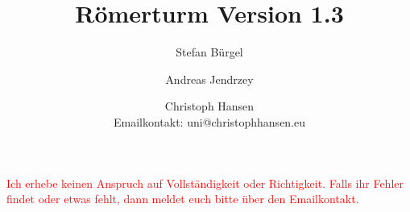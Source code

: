 \documentclass[a5paper,9pt,fleqn,twoside]{scrartcl}
\title{Römerturm Version 1.3}
\author{Stefan Bürgel \and Andreas Jendrzey \and Christoph Hansen \\ 
Emailkontakt: uni@christophhansen.eu}
\date{}
\begin{document}
\thispagestyle{empty}
\cleardoublepage
\maketitle


\textcolor{red}{Ich erhebe keinen Anspruch auf Vollständigkeit oder Richtigkeit. Falls ihr Fehler findet oder etwas fehlt, dann meldet euch bitte über den Emailkontakt.}

\setcounter{page}{1}
\begin{multicols}{2}
	\tableofcontents
\end{multicols}
	\pagebreak
	
	
	
	
	
	
	
	
\pagestyle{empty}
\clearpage
\section*{ }
\clearpage
\section*{ }
\end{document}
